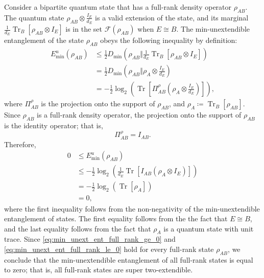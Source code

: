 \documentclass[twocolumn,letterpaper, dvipsnames,allowtoday, accepted = 2025-12-31]{quantumarticle}
\begin{document}
Consider a bipartite quantum state that has a full-rank density operator $\rho_{AB}$. The quantum state $\rho_{AB}\otimes\frac{I_{E}}{d_E}$ is a valid extension of the state, and its marginal $\frac{1}{d_E}\operatorname{Tr}_{B}\!\left[\rho_{AB}\otimes I_E\right]$ is in the set $\mathcal{F}\!\left(\rho_{AB}\right)$ when $E\cong B$. The min-unextendible entanglement of the state $\rho_{AB}$ obeys the following inequality by definition:
    \begin{align}
        E^u_{\min}\!\left(\rho_{AB}\right) &\le  \frac{1}{2}D_{\min}\!\left(\rho_{AB}\Big\Vert\frac{1}{d_E}\operatorname{Tr}_{B}\!\left[\rho_{AB}\otimes I_E\right]\right)\\
        &= \frac{1}{2}D_{\min}\!\left(\rho_{AB}\Big\Vert\rho_A\otimes \frac{I_E}{d_E}\right)\\
        &= -\frac{1}{2}\log_2\!\left(\operatorname{Tr}\!\left[\Pi^\rho_{AB}\left(\rho_{A}\otimes \frac{I_{E}}{d_E}\right)\right]\right),
    \end{align}
    where $\Pi^\rho_{AB}$ is the projection onto the support of $\rho_{AB}$, and $\rho_A \coloneqq \operatorname{Tr}_B\!\left[\rho_{AB}\right]$. Since $\rho_{AB}$ is a full-rank density operator, the projection onto the support of $\rho_{AB}$ is the identity operator; that is,
    \begin{equation}
        \Pi^\rho_{AB} = I_{AB}.
    \end{equation}
    Therefore,
    \begin{align}
        0 &\le E^u_{\min}\!\left(\rho_{AB}\right)\label{eq:min_unext_ent_full_rank_ge_0}\\
        &\le -\frac{1}{2}\log_2\!\left(\frac{1}{d_E}\operatorname{Tr}\!\left[I_{AB}\left(\rho_A\otimes I_{E}\right)\right]\right)\\
        &= -\frac{1}{2}\log_2\!\left(\operatorname{Tr}\!\left[\rho_A\right]\right)\\
        &= 0, \label{eq:min_unext_ent_full_rank_le_0}
    \end{align}
    where the first inequality follows from the non-negativity of the min-unextendible entanglement of states. The first equality follows from the the fact that $E\cong B$, and the last equality follows from the fact that $\rho_{A}$ is a quantum state with unit trace. Since \eqref{eq:min_unext_ent_full_rank_ge_0} and \eqref{eq:min_unext_ent_full_rank_le_0} hold for every full-rank state $\rho_{AB}$, we conclude that the min-unextendible entanglement of all full-rank states is equal to zero; that is, all full-rank states are super two-extendible. 
    
\end{document}
